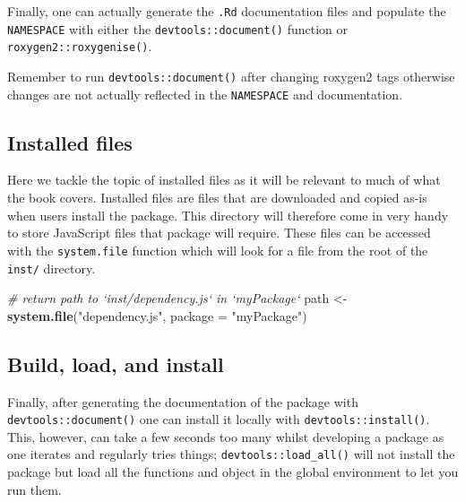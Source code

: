 \documentclass[10pt,]{krantz}
\makeatletter
\newenvironment{Shaded}{\begin{snugshade}}{\end{snugshade}}
\newcommand{\CommentTok}[1]{\textcolor[rgb]{0.37,0.37,0.37}{\textit{#1}}}
\newcommand{\DataTypeTok}[1]{\textcolor[rgb]{0.27,0.27,0.27}{#1}}
\newcommand{\KeywordTok}[1]{\textcolor[rgb]{0.27,0.27,0.27}{\textbf{#1}}}
\newcommand{\NormalTok}[1]{#1}
\newcommand{\StringTok}[1]{\textcolor[rgb]{0.5,0.5,0.5}{#1}}
\newenvironment{kframe}{%
\medskip{}
\setlength{\fboxsep}{.8em}
 \def\at@end@of@kframe{}%
 \ifinner\ifhmode%
  \def\at@end@of@kframe{\end{minipage}}%
  \begin{minipage}{\columnwidth}%
 \fi\fi%
 \def\FrameCommand##1{\hskip\@totalleftmargin \hskip-\fboxsep
 \colorbox{shadecolor}{##1}\hskip-\fboxsep
     \hskip-\linewidth \hskip-\@totalleftmargin \hskip\columnwidth}%
 \MakeFramed {\advance\hsize-\width
   \@totalleftmargin\z@ \linewidth\hsize
   \@setminipage}}%
 {\par\unskip\endMakeFramed%
 \at@end@of@kframe}
\renewenvironment{Shaded}{\begin{kframe}}{\end{kframe}}
\newenvironment{rmdblock}[1]
  {
  \begin{itemize}
  \renewcommand{\labelitemi}{
    \raisebox{-.7\height}[0pt][0pt]{
      {\setkeys{Gin}{width=3em,keepaspectratio}\texttt{[image: images/\#1]}}
    }
  }
  \setlength{\fboxsep}{1em}
  \begin{kframe}
  \item
  }
  {
  \end{kframe}
  \end{itemize}
  }
\newenvironment{rmdnote}
  {\begin{rmdblock}{note}}
  {\end{rmdblock}}
\makeatother
\begin{document}
Finally, one can actually generate the \texttt{.Rd} documentation files and populate the \texttt{NAMESPACE} with either the \texttt{devtools::document()} function or \texttt{roxygen2::roxygenise()}.

\begin{rmdnote}
Remember to run \texttt{devtools::document()} after changing roxygen2
tags otherwise changes are not actually reflected in the
\texttt{NAMESPACE} and documentation.
\end{rmdnote}

\hypertarget{basics-installed-files}{%
\subsection{Installed files}\label{basics-installed-files}}

Here we tackle the topic of installed files as it will be relevant to much of what the book covers. Installed files are files that are downloaded and copied as-is when users install the package. This directory will therefore come in very handy to store JavaScript files that package will require. These files can be accessed with the \texttt{system.file} function which will look for a file from the root of the \texttt{inst/} directory.

\begin{Shaded}
\begin{Highlighting}[]
\CommentTok{# return path to `inst/dependency.js` in `myPackage`}
\NormalTok{path <-}\StringTok{ }\KeywordTok{system.file}\NormalTok{(}\StringTok{"dependency.js"}\NormalTok{, }\DataTypeTok{package =} \StringTok{"myPackage"}\NormalTok{)}
\end{Highlighting}
\end{Shaded}

\hypertarget{basics-build-load-install}{%
\subsection{Build, load, and install}\label{basics-build-load-install}}

Finally, after generating the documentation of the package with \texttt{devtools::document()} one can install it locally with \texttt{devtools::install()}. This, however, can take a few seconds too many whilst developing a package as one iterates and regularly tries things; \texttt{devtools::load\_all()} will not install the package but load all the functions and object in the global environment to let you run them.
\end{document}
